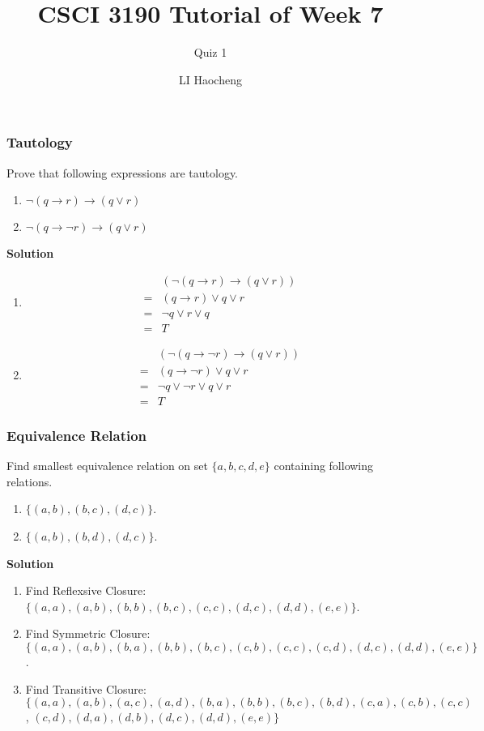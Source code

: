 \documentclass[10pt, compress]{beamer}
\title{CSCI 3190 Tutorial of Week 7}
\subtitle{Quiz 1}
\author{LI Haocheng}
\institute{Department of Computer Science and Engineering}
\begin{document}
\maketitle

\begin{frame}[fragile]
\frametitle{Tautology}
Prove that following expressions are tautology.
\begin{enumerate}
	\item $\neg (q \rightarrow r) \rightarrow (q \vee r)$
	\item $\neg (q \rightarrow \neg r) \rightarrow (q \vee r)$
\end{enumerate}
\textbf{Solution}
\begin{multicols}{2}
\begin{enumerate}
	\item \begin{align}
	& (\neg (q \rightarrow r) \rightarrow (q \vee r))\\
	= & (q \rightarrow r) \vee q \vee r\\
	= & \neg q \vee r \vee q\\
	= & T
	\end{align}
	
	\columnbreak
	
	\item \begin{align}
	& (\neg (q \rightarrow \neg r) \rightarrow (q \vee r))\\
	= & (q \rightarrow \neg r) \vee q \vee r\\
	= & \neg q \vee \neg r \vee q \vee r\\
	= & T
	\end{align}
\end{enumerate}
\end{multicols}
\end{frame}

\begin{frame}[fragile]
\frametitle{Equivalence Relation}
Find smallest equivalence relation on set $\{a, b, c, d, e\}$ containing following relations.
\begin{enumerate}
	\item $\{(a, b), (b, c), (d, c)\}$.
	\item $\{(a, b), (b, d), (d, c)\}$.
\end{enumerate}
\textbf{Solution}
\begin{enumerate}
	\item Find Reflexsive Closure: $\{(a, a), (a, b), (b, b), (b, c), (c, c), (d, c), (d, d), (e, e)\}$.
	\item Find Symmetric Closure: $\{(a, a), (a, b), (b, a), (b, b), (b, c), (c, b), (c, c), (c, d), (d, c), (d, d), (e, e)\}$.
	\item Find Transitive Closure: $\{(a, a), (a, b), (a, c), (a, d), (b, a), (b, b), (b, c), (b, d), (c, a), (c, b), (c, c)$, $(c, d), (d, a), (d, b), (d, c), (d, d), (e, e)\}$
\end{enumerate}
\end{frame}
\end{document}
